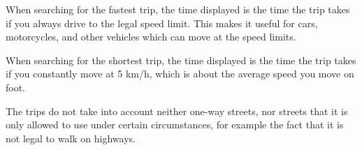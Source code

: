 When searching for the fastest trip, the time displayed is the time the trip takes if you always drive to the legal speed limit. This makes it useful for cars, motorcycles, and other vehicles which can move at the speed limits.

When searching for the shortest trip, the time displayed is the time the trip takes if you constantly move at 5 km/h, which is about the average speed you move on foot.

The trips do not take into account neither one-way streets, nor streets that it is only allowed to use under certain circumstances, for example the fact that it is not legal to walk on highways.
